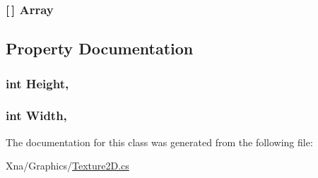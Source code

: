 \subsubsection[{Array}]{ \mbox{[}$\,$\mbox{]} Array\hspace{0.3cm}{\ttfamily [static]}}\label{classMicrosoft_1_1Xna_1_1Framework_1_1Graphics_1_1Texture2D_a3d7775c2b083ed36b9a886b22af95ab2}


\subsection{Property Documentation}
\hypertarget{classMicrosoft_1_1Xna_1_1Framework_1_1Graphics_1_1Texture2D_aaadefba794062a2ca7e58ceb10b955a1}{}
\subsubsection[{Height}]{\setlength{\rightskip}{0pt plus 5cm}int Height\hspace{0.3cm}{\ttfamily [get]}, {\ttfamily [set]}}\label{classMicrosoft_1_1Xna_1_1Framework_1_1Graphics_1_1Texture2D_aaadefba794062a2ca7e58ceb10b955a1}
\hypertarget{classMicrosoft_1_1Xna_1_1Framework_1_1Graphics_1_1Texture2D_abbe7749c3b402f7dfe64f936774cfcd4}{}
\subsubsection[{Width}]{\setlength{\rightskip}{0pt plus 5cm}int Width\hspace{0.3cm}{\ttfamily [get]}, {\ttfamily [set]}}\label{classMicrosoft_1_1Xna_1_1Framework_1_1Graphics_1_1Texture2D_abbe7749c3b402f7dfe64f936774cfcd4}


The documentation for this class was generated from the following file\+:\begin{DoxyCompactItemize}
\item 
Xna/\+Graphics/\hyperlink{Texture2D_8cs}{Texture2\+D.\+cs}\end{DoxyCompactItemize}
